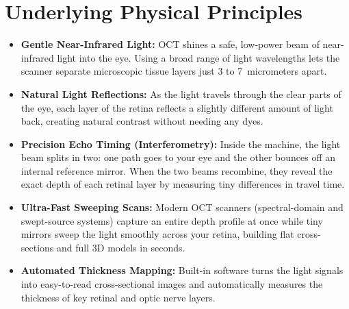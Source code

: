 \section{Underlying Physical Principles}
\begin{itemize}
\item \textbf{Gentle Near-Infrared Light:} OCT shines a safe, low-power beam of near-infrared light into the eye. Using a broad range of light wavelengths lets the scanner separate microscopic tissue layers just 3 to 7~micrometers apart.
\item \textbf{Natural Light Reflections:} As the light travels through the clear parts of the eye, each layer of the retina reflects a slightly different amount of light back, creating natural contrast without needing any dyes.
\item \textbf{Precision Echo Timing (Interferometry):} Inside the machine, the light beam splits in two: one path goes to your eye and the other bounces off an internal reference mirror. When the two beams recombine, they reveal the exact depth of each retinal layer by measuring tiny differences in travel time.
\item \textbf{Ultra-Fast Sweeping Scans:} Modern OCT scanners (spectral-domain and swept-source systems) capture an entire depth profile at once while tiny mirrors sweep the light smoothly across your retina, building flat cross-sections and full 3D models in seconds.
\item \textbf{Automated Thickness Mapping:} Built-in software turns the light signals into easy-to-read cross-sectional images and automatically measures the thickness of key retinal and optic nerve layers.
\end{itemize}

